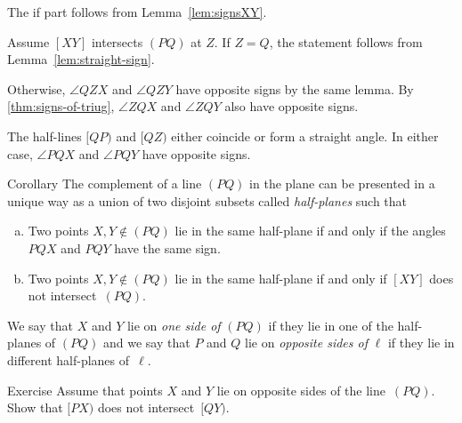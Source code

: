  The if part follows from Lemma~\ref{lem:signsXY}.

Assume $[XY]$ intersects $(PQ)$ at $Z$.
If $Z=Q$, the statement follows from Lemma~\ref{lem:straight-sign}.

Otherwise, $\angle QZX$ and $\angle QZY$ have opposite signs by the same lemma.
By \ref{thm:signs-of-triug}, $\angle ZQX$ and $\angle ZQY$ also have opposite signs.

The half-lines $[QP)$ and $[QZ)$ either coincide or form a straight angle.
In either case, $\angle PQX$ and $\angle PQY$ have opposite signs.
\qeds

\begin{thm}[\abs]{Corollary}\label{cor:half-plane}
The complement of a line $(PQ)$ in the plane 
can be presented in a unique way as a union of two disjoint subsets 
called \emph{half-planes}
such that 
\begin{enumerate}[(a)]
\item\label{cor:half-plane:angle} Two points $X,Y\notin(PQ)$ lie in the same half-plane if and only if the angles $PQX$ and $PQY$ have the same sign.
\item\label{cor:half-plane:intersect} Two points $X,Y\notin(PQ)$ lie in the same half-plane if and only if $[XY]$ does not intersect~$(PQ)$.
\end{enumerate}

\end{thm}

We say that $X$ and $Y$ lie on {}\emph{one side of} $(PQ)$ if they lie in one of the half-planes of $(PQ)$ and we say that  $P$ and $Q$ lie on {}\emph{opposite sides of} $\ell$ if they lie in different half-planes of~$\ell$.


\begin{thm}{Exercise}\label{ex:Z}
Assume that points $X$ and $Y$ lie on opposite sides of the line~$(PQ)$.
Show that $[PX)$ does not intersect~$[QY)$.
\end{thm}


